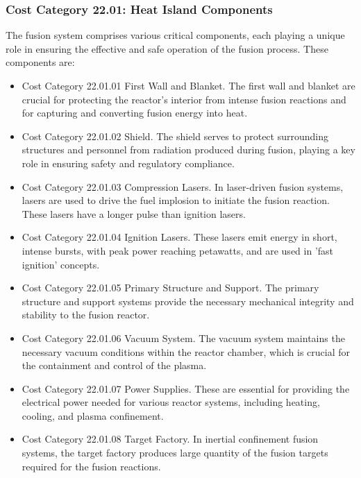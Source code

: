 \subsubsection{Cost Category 22.01: Heat Island Components}

The fusion system comprises various critical components, each playing a unique role in ensuring the effective and safe operation of the fusion process. These components are:

\begin{itemize}
    \item Cost Category 22.01.01 First Wall and Blanket. The first wall and blanket are crucial for protecting the reactor's interior from intense fusion reactions and for capturing and converting fusion energy into heat.
    
    \item Cost Category 22.01.02 Shield. The shield serves to protect surrounding structures and personnel from radiation produced during fusion, playing a key role in ensuring safety and regulatory compliance.
    
    \item Cost Category 22.01.03 Compression Lasers. In laser-driven fusion systems, lasers are used to drive the fuel implosion to initiate the fusion reaction.  These lasers have a longer pulse than ignition lasers.  
    
    \item Cost Category 22.01.04 Ignition Lasers. These lasers emit energy in short, intense bursts, with peak power reaching petawatts, and are used in 'fast ignition' concepts.
    
    \item Cost Category 22.01.05 Primary Structure and Support. The primary structure and support systems provide the necessary mechanical integrity and stability to the fusion reactor.
    
    \item Cost Category 22.01.06 Vacuum System. The vacuum system maintains the necessary vacuum conditions within the reactor chamber, which is crucial for the containment and control of the plasma.
    
    \item Cost Category 22.01.07 Power Supplies. These are essential for providing the electrical power needed for various reactor systems, including heating, cooling, and plasma confinement.
    
    \item Cost Category 22.01.08 Target Factory. In inertial confinement fusion systems, the target factory produces large quantity of the fusion targets required for the fusion reactions.


\end{itemize}
